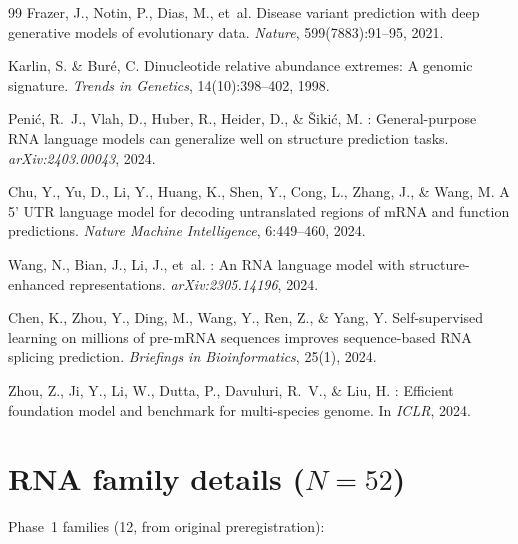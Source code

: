\documentclass[11pt]{article}
\begin{document}
\begin{thebibliography}{99}
Frazer, J., Notin, P., Dias, M., et~al.
\newblock Disease variant prediction with deep generative models
  of evolutionary data.
\newblock \emph{Nature}, 599(7883):91--95, 2021.

Karlin, S. \& Bur\'{e}, C.
\newblock Dinucleotide relative abundance extremes: A genomic
  signature.
\newblock \emph{Trends in Genetics}, 14(10):398--402, 1998.

Peni\'{c}, R.~J., Vlah, D., Huber, R., Heider, D., \&
  \v{S}iki\'{c}, M.
: General-purpose {RNA} language models can
  generalize well on structure prediction tasks.
\newblock \emph{arXiv:2403.00043}, 2024.

Chu, Y., Yu, D., Li, Y., Huang, K., Shen, Y., Cong, L.,
  Zhang, J., \& Wang, M.
\newblock A 5' {UTR} language model for decoding untranslated
  regions of {mRNA} and function predictions.
\newblock \emph{Nature Machine Intelligence}, 6:449--460, 2024.

Wang, N., Bian, J., Li, J., et~al.
: An {RNA} language model with structure-enhanced
  representations.
\newblock \emph{arXiv:2305.14196}, 2024.

Chen, K., Zhou, Y., Ding, M., Wang, Y., Ren, Z., \& Yang, Y.
\newblock Self-supervised learning on millions of pre-{mRNA} sequences
  improves sequence-based {RNA} splicing prediction.
\newblock \emph{Briefings in Bioinformatics}, 25(1), 2024.

Zhou, Z., Ji, Y., Li, W., Dutta, P., Davuluri, R.~V., \& Liu, H.
: Efficient foundation model and benchmark for
  multi-species genome.
\newblock In \emph{ICLR}, 2024.

\end{thebibliography}


\appendix
\section{RNA family details ($N = 52$)}
\label{sec:appendix_families}

Phase~1 families (12, from original preregistration):
\end{document}
